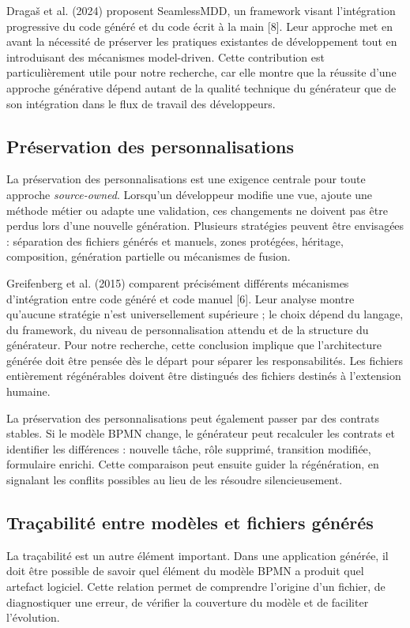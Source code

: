 Dragaš et al. (2024) proposent SeamlessMDD, un framework visant l'intégration progressive du code généré et du code écrit à la main [8]. Leur approche met en avant la nécessité de préserver les pratiques existantes de développement tout en introduisant des mécanismes model-driven. Cette contribution est particulièrement utile pour notre recherche, car elle montre que la réussite d'une approche générative dépend autant de la qualité technique du générateur que de son intégration dans le flux de travail des développeurs.

\subsection{Préservation des personnalisations}

La préservation des personnalisations est une exigence centrale pour toute approche \textit{source-owned}. Lorsqu'un développeur modifie une vue, ajoute une méthode métier ou adapte une validation, ces changements ne doivent pas être perdus lors d'une nouvelle génération. Plusieurs stratégies peuvent être envisagées : séparation des fichiers générés et manuels, zones protégées, héritage, composition, génération partielle ou mécanismes de fusion.

Greifenberg et al. (2015) comparent précisément différents mécanismes d'intégration entre code généré et code manuel [6]. Leur analyse montre qu'aucune stratégie n'est universellement supérieure ; le choix dépend du langage, du framework, du niveau de personnalisation attendu et de la structure du générateur. Pour notre recherche, cette conclusion implique que l'architecture générée doit être pensée dès le départ pour séparer les responsabilités. Les fichiers entièrement régénérables doivent être distingués des fichiers destinés à l'extension humaine.

La préservation des personnalisations peut également passer par des contrats stables. Si le modèle BPMN change, le générateur peut recalculer les contrats et identifier les différences : nouvelle tâche, rôle supprimé, transition modifiée, formulaire enrichi. Cette comparaison peut ensuite guider la régénération, en signalant les conflits possibles au lieu de les résoudre silencieusement.

\subsection{Traçabilité entre modèles et fichiers générés}

La traçabilité est un autre élément important. Dans une application générée, il doit être possible de savoir quel élément du modèle BPMN a produit quel artefact logiciel. Cette relation permet de comprendre l'origine d'un fichier, de diagnostiquer une erreur, de vérifier la couverture du modèle et de faciliter l'évolution.

